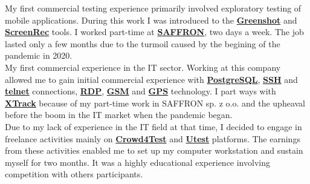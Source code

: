 \documentclass[theme]{cv_einstein}
\begin{document}
\begin{paracol}{2}
\begin{rightcolumn}
            {My first commercial testing experience primarily involved exploratory testing of mobile applications. During this work I was introduced to the \href{https://getgreenshot.org/}{\textbf{Greenshot}} and \href{https://screenrec.com/}{\textbf{ScreenRec}} tools. I worked part-time at \href{https://saffron.pl/}{\textbf{SAFFRON}}, two days a week. The job lasted only a few months due to the turmoil caused by the begining of the pandemic in 2020.}
            \vspace{\itemspace}\\
            {My first commercial experience in the IT sector. Working at this company allowed me to gain initial commercial experience with \href{https://www.postgresql.org/}{\textbf{PostgreSQL}}, \href{https://www.openssh.com/}{\textbf{SSH}} and \href{https://www.telnet.org/}{\textbf{telnet}} connections, \href{https://learn.microsoft.com/en-us/windows/security/identity-protection/hello-for-business/hello-feature-remote-desktop}{\textbf{RDP}}, \href{https://www.gsma.com/}{\textbf{GSM}} and \href{https://www.gps.gov/}{\textbf{GPS}} technology. I part ways with \href{https://xtrack.com/}{\textbf{XTrack}} because of my part-time work in SAFFRON sp. z o.o. and the upheaval before the boom in the IT market when the pandemic began.}
            \vspace{\itemspace}\\
            {Due to my lack of experience in the IT field at that time, I decided to engage in freelance activities mainly on \href{https://www.crowd4test.com/}{\textbf{Crowd4Test}} and \href{https://www.utest.com/}{\textbf{Utest}} platforms. The earnings from these activities enabled me to set up my computer workstation and sustain myself for two months. It was a highly educational experience involving competition with others participants.}
            \vspace{0.1cm}\\

\end{rightcolumn}
\end{paracol}
\end{document}
